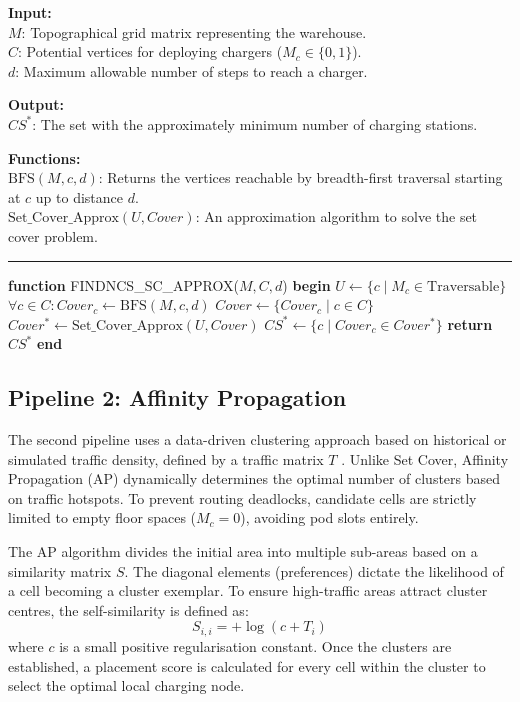 \documentclass[conference]{IEEEtran}
\newcommand{\alginput}[1]{\vspace{0.2cm}\noindent\textbf{Input:}\\ \indent #1}
\newcommand{\algoutput}[1]{\vspace{0.2cm}\noindent\textbf{Output:}\\ \indent #1}
\newcommand{\algfunc}[1]{\vspace{0.2cm}\noindent\textbf{Functions:}\\ \indent #1}
\begin{document}
\begin{algorithm}[htbp]
\caption{FINDNCS\_SC\_APPROX: Set Cover Approximation}
\label{alg:set_cover}
\alginput{
$M$: Topographical grid matrix representing the warehouse.\\
$C$: Potential vertices for deploying chargers ($M_c \in \{0, 1\}$).\\
$d$: Maximum allowable number of steps to reach a charger.
}
\algoutput{
$CS^*$: The set with the approximately minimum number of charging stations.
}
\algfunc{
$\text{BFS}(M, c, d)$: Returns the vertices reachable by breadth-first traversal starting at $c$ up to distance $d$.\\
$\text{Set\_Cover\_Approx}(U, Cover)$: An approximation algorithm to solve the set cover problem.
}
\vspace{0.2cm}
\hrule
\vspace{0.2cm}
\begin{algorithmic}[1]
\STATE \textbf{function} FINDNCS\_SC\_APPROX($M, C, d$)
\STATE \textbf{begin}
\STATE \quad $U \leftarrow \{ c \mid M_c \in \text{Traversable} \}$
\STATE \quad $\forall c \in C: Cover_c \leftarrow \text{BFS}(M, c, d)$
\STATE \quad $Cover \leftarrow \{ Cover_c \mid c \in C \}$
\STATE \quad $Cover^* \leftarrow \text{Set\_Cover\_Approx}(U, Cover)$
\STATE \quad $CS^* \leftarrow \{ c \mid Cover_c \in Cover^* \}$
\STATE \quad \textbf{return} $CS^*$
\STATE \textbf{end}
\end{algorithmic}
\end{algorithm}

\subsection{Pipeline 2: Affinity Propagation}
The second pipeline uses a data-driven clustering approach based on historical or simulated traffic density, defined by a traffic matrix $T$ \cite{baras2023}. Unlike Set Cover, Affinity Propagation (AP) dynamically determines the optimal number of clusters based on traffic hotspots. To prevent routing deadlocks, candidate cells are strictly limited to empty floor spaces ($M_c = 0$), avoiding pod slots entirely.

The AP algorithm divides the initial area into multiple sub-areas based on a similarity matrix $S$. The diagonal elements (preferences) dictate the likelihood of a cell becoming a cluster exemplar. To ensure high-traffic areas attract cluster centres, the self-similarity is defined as:
\begin{equation}
    S_{i,i} = +\log(c + T_i)
\end{equation}
where $c$ is a small positive regularisation constant. Once the clusters are established, a placement score is calculated for every cell within the cluster to select the optimal local charging node.
\end{document}

